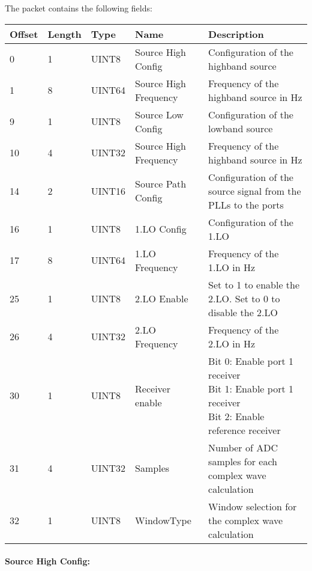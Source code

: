 \documentclass[a4paper,11pt]{article}
\newcommand{\bitrect}[2]{
  \begin{pgfonlayer}{foreground}
    \draw [thick] (0,0) rectangle (#1,1);
    \pgfmathsetmacro\result{#1-1}
    \foreach \x in {1,...,\result}
      \draw [thick] (\x,1) -- (\x, 0.8);
  \end{pgfonlayer}
  \bitlabels{#1}{#2}
}
\newcommand{\rwbits}[3]{
  \draw [thick] (#1,0) rectangle ++(#2,1) node[pos=0.5]{#3};
  \pgfmathsetmacro\start{#1+0.5}
  \pgfmathsetmacro\finish{#1+#2-0.5}
}
\newcommand{\robits}[3]{
  \begin{pgfonlayer}{background}
    \draw [thick, fill=lightgray] (#1,0) rectangle ++(#2,1) node[pos=0.5]{#3};
  \end{pgfonlayer}
  \pgfmathsetmacro\start{#1+0.5}
  \pgfmathsetmacro\finish{#1+#2-0.5}
}
\newcommand{\bitlabels}[2]{
  \foreach \bit in {1,...,#1}{
     \pgfmathsetmacro\result{#2}
     \node [above] at (\bit-0.5, 1) {\pgfmathprintnumber{\result}};
   }
}
\begin{document}
The packet contains the following fields:
\begin{ThreePartTable}
\setlength\tabcolsep{3pt}

\begin{longtable}{p{} |  p{}  |  p{}| p{} | p{}}
\toprule
\textbf{Offset} &\textbf{Length} &\textbf{Type} & \textbf{Name} &\textbf{Description} \\ 
\hline
\endhead
\midrule[\heavyrulewidth]
\endfoot  
\midrule[\heavyrulewidth]
\endlastfoot

0 & 1 & UINT8 & Source High Config & Configuration of the highband source \\
1 & 8 & UINT64 & Source High Frequency & Frequency of the highband source in Hz \\
9 & 1 & UINT8 & Source Low Config & Configuration of the lowband source \\
10 & 4 & UINT32 & Source High Frequency & Frequency of the highband source in Hz \\
14 & 2 & UINT16 & Source Path Config & Configuration of the source signal from the PLLs to the ports \\
16 & 1 & UINT8 & 1.LO Config & Configuration of the 1.LO \\
17 & 8 & UINT64 & 1.LO Frequency & Frequency of the 1.LO in Hz \\
25 & 1 & UINT8 & 2.LO Enable & Set to 1 to enable the 2.LO. Set to 0 to disable the 2.LO \\
26 & 4 & UINT32 & 2.LO Frequency & Frequency of the 2.LO in Hz \\
\hline
30 & 1 & UINT8 & Receiver enable & \makecell[l]{Bit 0: Enable port 1 receiver\\Bit 1: Enable port 1 receiver\\Bit 2: Enable reference receiver} \\
\hline
31 & 4 & UINT32 & Samples & Number of ADC samples for each complex wave calculation \\
32 & 1 & UINT8 & WindowType & Window selection for the complex wave calculation \\
\end{longtable}   
\end{ThreePartTable}

\paragraph{Source High Config:}
\begin{center}
\end{center}
\end{document}
